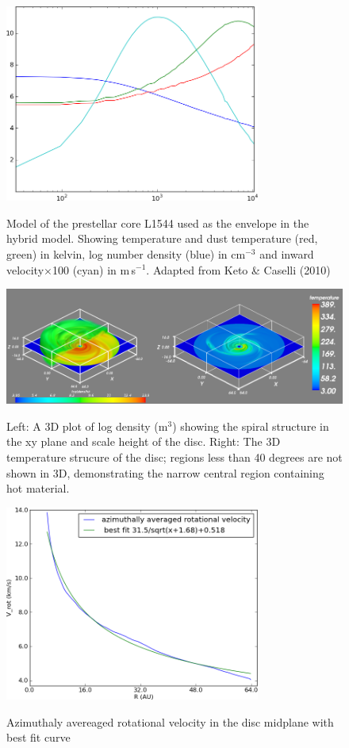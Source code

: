 \documentclass[useAMS,usenatbib]{mn2e}
\begin{document}
\begin{figure}
 \includegraphics[width=84mm]{Figures/model/L1544model_used.png}
 \label{L1544}
 \caption{Model of the prestellar core L1544 used as the envelope in the hybrid model. Showing temperature and dust temperature (red, green) in kelvin, log number density (blue) in cm$^{-3}$ and inward velocity$\times$100 (cyan) in m$\,$s$^{-1}$. Adapted from Keto \& Caselli (2010)}
\end{figure}

\begin{figure}
 \includegraphics[width=168mm]{Figures/model/rhoT2.png}
 \label{rhoT} 
 \caption{Left: A 3D plot of log density (m$^3$) showing the spiral structure in the xy plane and scale height of the disc. Right: The 3D temperature strucure of the disc; regions less than 40 degrees are not shown in 3D, demonstrating the narrow central region containing hot material.}
\end{figure}

\begin{figure}
 \includegraphics[width=84mm]{Figures/model/rotational_velocities.png}
 \label{velocity}
 \caption{Azimuthaly avereaged rotational velocity in the disc midplane with best fit curve}
\end{figure}
\end{document}
